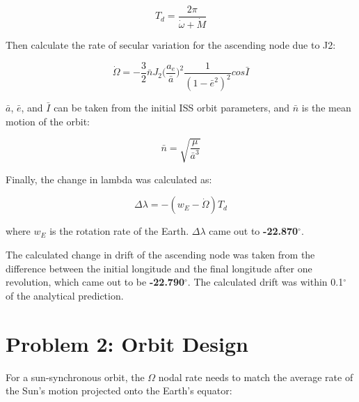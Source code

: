 \documentclass[conf]{new-aiaa}
\begin{document}





\begin{equation}
	T_d = \frac{2 \pi}{\dot{\omega} + \dot{M}}
\end{equation}

Then calculate the rate of secular variation for the ascending node due to J2: 

\begin{equation}
	\dot{\Omega} = - \frac{3}{2} \bar{n} J_2 \big( \frac{a_e}{ \bar{a} } \big) ^2 \frac{1}{(1-\bar{e}^2)^2} cos \bar{I}
\end{equation}

$\bar{a}$, $\bar{e}$, and $\bar{I}$ can be taken from the initial ISS orbit parameters, and $\bar{n}$ is the mean motion of the orbit: 

\begin{equation}
	\bar{n} = \sqrt{\frac{\mu}{\bar{a}^3}}
\end{equation}

Finally, the change in lambda was calculated as: 

\begin{equation}
	\Delta \lambda = -(w_E - \dot{\Omega}) T_d 
\end{equation}

where $w_E$ is the rotation rate of the Earth. $\Delta \lambda$ came out to \textbf{-22.870$^\circ$}. 

The calculated change in drift of the ascending node was taken from the difference between the initial longitude and the final longitude after one revolution, which came out to be \textbf{-22.790$^\circ$}. The calculated drift was within 0.1$^\circ$ of the analytical prediction.  



\section*{Problem 2: Orbit Design}

For a sun-synchronous orbit, the $\Omega$ nodal rate needs to match the average rate of the Sun's motion projected onto the Earth's equator: 
\end{document}
